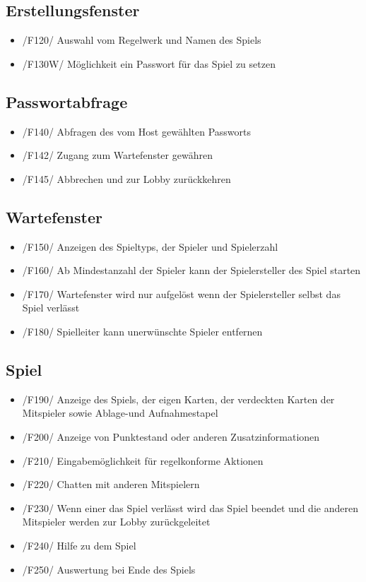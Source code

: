 \documentclass{article}
\begin{document}
\subsection{Erstellungsfenster}
\begin{itemize}
	\item /F120/ Auswahl vom \gls{Regelwerk} und  Namen des Spiels 
	\item /F130W/ Möglichkeit ein Passwort für das Spiel zu setzen
\end{itemize}

\subsection{Passwortabfrage}
\begin{itemize}
	\item /F140/ Abfragen des vom Host gewählten Passworts
	\item /F142/ Zugang zum \gls{Wartefenster} gewähren
	\item /F145/ Abbrechen und zur Lobby zurückkehren
\end{itemize}

\subsection{Wartefenster}
\begin{itemize}
	\item /F150/ Anzeigen des Spieltyps, der Spieler und Spielerzahl
	\item /F160/ Ab Mindestanzahl der Spieler kann der Spielersteller des Spiel starten
	\item /F170/ \gls{Wartefenster} wird nur aufgelöst wenn der Spielersteller selbst das Spiel verlässt
	\item /F180/ Spielleiter kann unerwünschte Spieler entfernen
\end{itemize}

\subsection{Spiel}
\begin{itemize}
	\item /F190/ Anzeige des Spiels, der eigen Karten, der verdeckten Karten der Mitspieler sowie Ablage-und Aufnahmestapel
	\item /F200/ Anzeige von Punktestand oder anderen Zusatzinformationen
	\item /F210/ Eingabemöglichkeit für regelkonforme Aktionen
	\item /F220/ Chatten mit anderen Mitspielern
	\item /F230/ Wenn einer das Spiel verlässt wird das Spiel beendet und die anderen Mitspieler werden zur \gls{Lobby} zurückgeleitet
	\item /F240/ Hilfe zu dem Spiel
	\item /F250/ Auswertung bei Ende des Spiels
\end{itemize}
\end{document}
